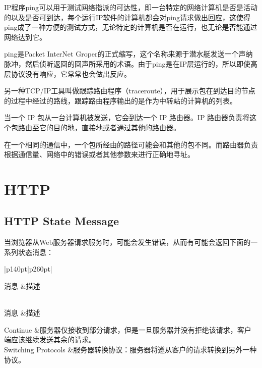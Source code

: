 IP程序ping可以用于测试网络指派的可达性，即一台特定的网络计算机是否是活动的以及是否可到达，每个运行IP软件的计算机都会对ping请求做出回应，这使得ping成了一种方便的测试方式，无论特定的计算机是否在运行，也无论是否能通过网络达到它。

ping是Packet InterNet Groper的正式缩写，这个名称来源于潜水艇发送一个声纳脉冲，然后侦听返回的回声所采用的术语。由于ping是在IP层运行的，所以即使高层协议没有响应，它常常也会做出反应。

另一种TCP/IP工具叫做跟踪路由程序（traceroute），用于展示包在到达目的节点的过程中经过的路线，跟踪路由程序输出的是作为中转站的计算机的列表。


当一个 IP 包从一台计算机被发送，它会到达一个 IP 路由器。IP 路由器负责将这个包路由至它的目的地，直接地或者通过其他的路由器。

在一个相同的通信中，一个包所经由的路径可能会和其他的包不同。而路由器负责根据通信量、网络中的错误或者其他参数来进行正确地寻址。


\section{HTTP}



\subsection{HTTP State Message}


当浏览器从Web服务器请求服务时，可能会发生错误，从而有可能会返回下面的一系列状态消息：


\begin{longtable}{|p{140pt}|p{260pt}|}

\tabularnewline\hline
消息			&描述		
\endhead

\caption{1xx: 信息}\\
\hline
消息			&描述
\endfirsthead


\endfoot


\endlastfoot

 Continue				&服务器仅接收到部分请求，但是一旦服务器并没有拒绝该请求，客户端应该继续发送其余的请求。\\
 Switching Protocols	&服务器转换协议：服务器将遵从客户的请求转换到另外一种协议。							\\
\hline
\end{longtable}


